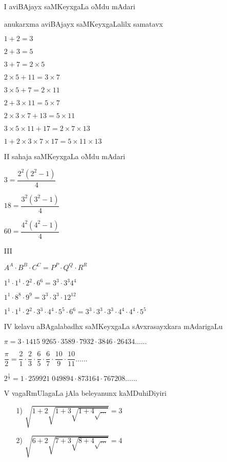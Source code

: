 \begin{enumerate}
\item[{\rm I}] aviBAjayx saMKeyxgaLa oMdu mAdari

anukarxma aviBAjayx saMKeyxgaLalilx samatavx

$1+2=3$

$2+3=5$

$3+7= 2 \times 5$

$2 \times 5+11=3 \times 7$

$3 \times 5+7= 2 \times 11$

$2+3 \times 11= 5 \times 7$

$2 \times 3 \times 7 + 13= 5 \times 11$

$3 \times 5 \times 11 + 17= 2 \times 7 \times 13$

$1+2 \times 3 \times 7 \times 17 = 5 \times 11 \times 13$

\item[{\rm II}] sahaja saMKeyxgaLa oMdu mAdari

$3= \dfrac{2^{2}(2^{2}-1)}{4}$

$18= \dfrac{3^{2}(3^{2}-1)}{4}$

$60= \dfrac{4^{2}(4^{2}-1)}{4}$

\item[{\rm III}] 

$A^{A}\cdot B^{B}\cdot C^{C}=P^{P}\cdot Q^{Q}\cdot R^{R}$

$1^{1}\cdot 1^{1}\cdot 2^{2}\cdot 6^{6}=3^{3}\cdot 3^{3}4^{4}$

$1^{1}\cdot 8^{8}\cdot 9^{9}=3^{3}\cdot 3^{3}\cdot 12^{12}$

$1^{1}\cdot 1^{1}\cdot 2^{2}\cdot 3^{3}\cdot 4^{4}\cdot 5^{5}\cdot 6^{6} = 3^{3}\cdot 3^{3}\cdot 3^{3}\cdot 4^{4}\cdot 4^{4}\cdot 5^{5}$

\item[{\rm IV}] kelavu aBAgalabadhx saMKeyxgaLa sAvxrasayxkara mAdarigaLu

$\pi = 3\cdot 1415 \; 9265\cdot 3589\cdot 7932\cdot 3846\cdot 26434 \ldots\ldots$

$\dfrac{\pi}{2}= \dfrac{2}{1} \cdot \dfrac{2}{3}  \cdot \dfrac{6}{5}\cdot \dfrac{6}{7}\cdot \dfrac{10}{9}\cdot \dfrac{10}{11}\ldots\ldots $

$2^{\frac{1}{3}}= 1\cdot 259921 \; 049894\cdot 873164\cdot 767208\ldots\ldots$

\item[{\rm V}] vagaRmUlagaLa jAla beleyanunx kaMDuhiDiyiri
\begin{itemize}
\item[{\rm 1)}] $\sqrt{1+2\sqrt{1+3\sqrt{1+4\sqrt{\ldots}}}} =3$
\item[{\rm 2)}] $\sqrt{6+2\sqrt{7+3\sqrt{8+4\sqrt{\ldots}}}} =4$
\end{itemize}


\end{enumerate}
